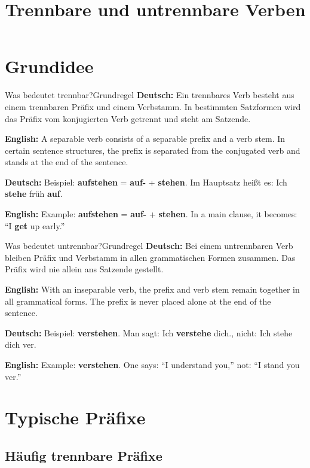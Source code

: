 \documentclass[a4paper,11pt]{article}
\title{Trennbare und untrennbare Verben}
\author{}
\date{}
\newcommand{\GermanText}[1]{\textbf{Deutsch: }#1\par}
\newcommand{\EnglishText}[1]{{\small\color{SoftGray}\textbf{English: }#1\par}}
\begin{document}
    \maketitle
    \tableofcontents
    \newpage

    \section{Grundidee}

        \begin{grammarentry}{Was bedeutet \glqq trennbar\grqq?}{Grundregel}
            \GermanText{Ein trennbares Verb besteht aus einem trennbaren Präfix und einem Verbstamm. In bestimmten Satzformen wird das Präfix vom konjugierten Verb getrennt und steht am Satzende.}
            \EnglishText{A separable verb consists of a separable prefix and a verb stem. In certain sentence structures, the prefix is separated from the conjugated verb and stands at the end of the sentence.}

            \GermanText{Beispiel: \textbf{aufstehen} = \textbf{auf-} + \textbf{stehen}. Im Hauptsatz heißt es: \glqq Ich \textbf{stehe} früh \textbf{auf}.\grqq}
            \EnglishText{Example: \textbf{aufstehen} = \textbf{auf-} + \textbf{stehen}. In a main clause, it becomes: ``I \textbf{get} up early.''}
        \end{grammarentry}

        \begin{grammarentry}{Was bedeutet \glqq untrennbar\grqq?}{Grundregel}
            \GermanText{Bei einem untrennbaren Verb bleiben Präfix und Verbstamm in allen grammatischen Formen zusammen. Das Präfix wird nie allein ans Satzende gestellt.}
            \EnglishText{With an inseparable verb, the prefix and verb stem remain together in all grammatical forms. The prefix is never placed alone at the end of the sentence.}

            \GermanText{Beispiel: \textbf{verstehen}. Man sagt: \glqq Ich \textbf{verstehe} dich.\grqq, nicht: \glqq Ich stehe dich ver.\grqq}
            \EnglishText{Example: \textbf{verstehen}. One says: ``I understand you,'' not: ``I stand you ver.''}
        \end{grammarentry}


    \section{Typische Präfixe}

        \subsection{Häufig trennbare Präfixe}
\end{document}
